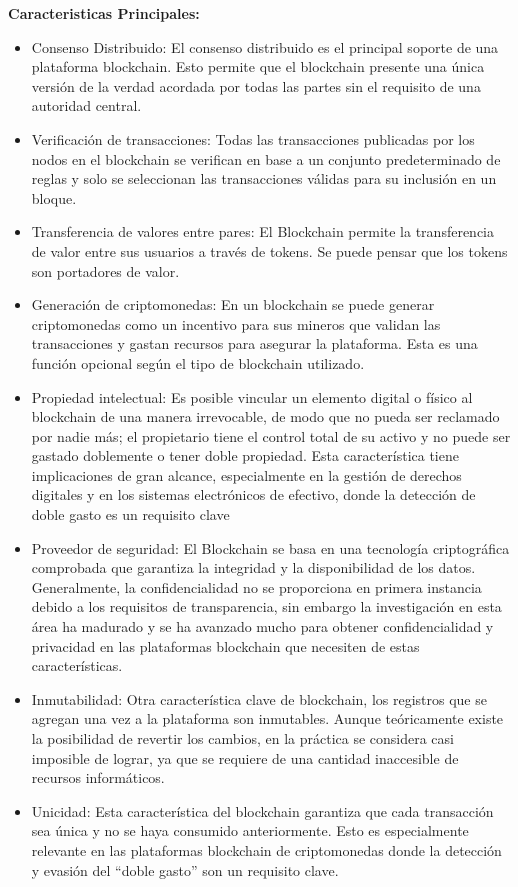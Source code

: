 \textbf{Caracteristicas Principales:}

\begin{itemize}
    \item Consenso Distribuido: El consenso distribuido es el principal soporte de una plataforma blockchain. Esto permite que el blockchain presente una única versión de la verdad acordada por todas las partes sin el requisito de una autoridad central.
    \item Verificación de transacciones: Todas las transacciones publicadas por los  nodos en el blockchain se verifican en base a un conjunto predeterminado de reglas y solo se seleccionan las transacciones válidas para su inclusión en un bloque.
    \item Transferencia de valores entre pares: El Blockchain permite la transferencia de valor entre sus usuarios a través de tokens. Se puede pensar que los tokens son portadores de valor.
    \item Generación de criptomonedas: En un blockchain se  puede generar criptomonedas como un incentivo para sus mineros que validan las transacciones y gastan recursos para asegurar la plataforma. Esta es una función opcional según el tipo de blockchain utilizado.
    \item Propiedad intelectual: Es posible vincular un elemento digital o físico al blockchain de una manera irrevocable, de modo que no pueda ser reclamado por nadie más; el propietario tiene el control total de su activo y no puede ser gastado doblemente o tener doble propiedad. Esta característica tiene implicaciones de gran alcance, especialmente en la gestión de derechos digitales y en los sistemas electrónicos de efectivo, donde la detección de doble gasto es un requisito clave
    \item Proveedor de seguridad: El Blockchain se basa en una tecnología criptográfica comprobada que garantiza la integridad y la disponibilidad de los datos. Generalmente, la confidencialidad no se proporciona en primera instancia debido a los requisitos de transparencia, sin embargo la investigación en esta área ha  madurado y se ha avanzado mucho para obtener confidencialidad y privacidad en las plataformas blockchain que necesiten de estas características.
    \item Inmutabilidad: Otra característica clave de blockchain, los registros que se agregan una vez a la plataforma son inmutables. Aunque teóricamente existe la posibilidad de revertir los cambios, en la práctica se considera casi imposible de lograr, ya que se requiere de una cantidad inaccesible de recursos informáticos.
    \item Unicidad: Esta característica del blockchain garantiza que cada transacción sea única y no se haya consumido anteriormente. Esto es especialmente relevante en las plataformas blockchain de criptomonedas donde la detección y  evasión  del “doble gasto” son un requisito clave.
\end{itemize}


